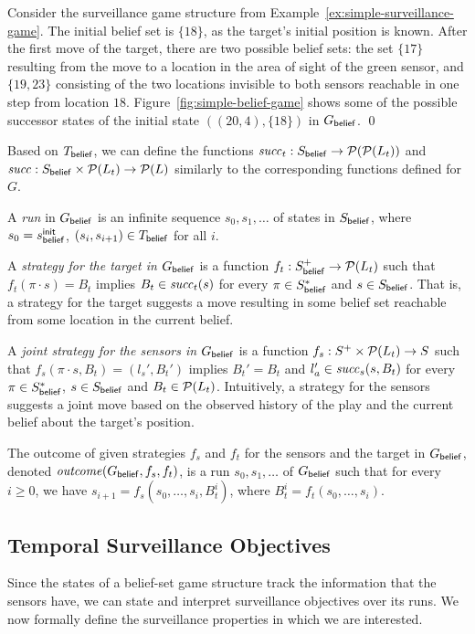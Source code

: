 \begin{example}\label{ex:simple-belief-game}
Consider the surveillance game structure from Example~\ref{ex:simple-surveillance-game}. The initial belief set is $\{18\}$, as the target's initial position is known. After the first move of the target, there are two possible belief sets: the set $\{17\}$ resulting from the move to a location in the area of sight of the green sensor, and $\{19,23\}$ consisting of the two locations invisible to both sensors reachable in one step from location $18$.
Figure~\ref{fig:simple-belief-game} shows some of the possible successor states of the initial state $((20,4),\{18\})$ in $G_{\mathsf{belief}}$. \qed
\end{example}

Based on  $T_{\mathsf{belief}}$, we can define the functions $\mathit{succ}_t : S_{\mathsf{belief}} \to \mathcal{P}(\mathcal{P}(L_t))$ and  $\mathit{succ} : S_{\mathsf{belief}} \times \mathcal{P}(L_t) \to \mathcal{P}(L)$ similarly to the corresponding functions defined for $G$. 

A \emph{run} in $G_{\mathsf{belief}}$ is an infinite sequence $s_0,s_1,\ldots$ of states in $S_{\mathsf{belief}}$, where $s_0 = s_{\mathsf{belief}}^{\mathsf{init}}$,  $(s_i,s_{i+1}) \in T_{\mathsf{belief}}$ for all $i$. 

A \emph{strategy for the target in $G_{\mathsf{belief}}$} is a function $f_t: S_{\mathsf{belief}}^+ \to \mathcal{P}(L_t)$ such that $f_t(\pi\cdot s) = B_t$ implies $B_t \in \mathit{succ}_t(s)$ for every $\pi \in S_{\mathsf{belief}}^*$ and $s \in S_{\mathsf{belief}}$. That is, a strategy for the target suggests a move resulting in some belief set reachable from some location in the current belief.

A \emph{joint strategy for the sensors in $G_{\mathsf{belief}}$} is a function $f_s : S^+ \times \mathcal{P}(L_t) \to S$ such that $f_s(\pi\cdot s,B_t) = (l_s',B_t')$ implies $B_t' = B_t$ and $l_a' \in \mathit{succ}_s(s,B_t)$ for every $\pi \in S_{\mathsf{belief}}^*$, $s \in S_{\mathsf{belief}}$ and $B_t \in \mathcal{P}(L_t)$. Intuitively, a strategy for the sensors suggests a joint move based on the observed history of the play and the current belief about the target's position.

The outcome of given strategies $f_s$ and $f_t$ for the sensors and the target in $G_{\mathsf{belief}}$, denoted $\mathit{outcome}(G_{\mathsf{belief}},f_s,f_t)$, is a run $s_0,s_1,\ldots$ of $G_{\mathsf{belief}}$ such that for every $i \geq 0$, we have $s_{i+1} = f_s(s_0,\ldots,s_i,B_t^i)$, where $B_t^i = f_t(s_0,\ldots,s_i)$.

\subsection{Temporal Surveillance Objectives}
Since the states of a belief-set game structure track the information that the sensors have, we can state and interpret surveillance objectives over its runs. We now formally define the surveillance properties in which we are interested. 

